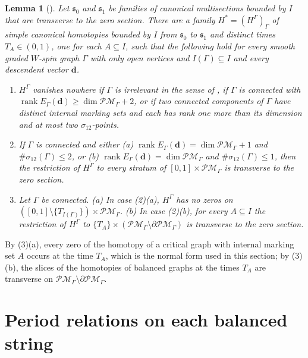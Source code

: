 \documentclass[11pt]{amsart}
\newtheorem{lemma}[theorem]{Lemma}
\theoremstyle{definition}
\theoremstyle{remark}
\begin{document}
\begin{lemma}[{\cite[Lem.~3.40]{GKT}}]
\label{lem:gktextension}
Let $\mathfrak s_0$ and $\mathfrak s_1$ be families of canonical multisections
bounded by $I$ that are transverse to the zero section.  There are a family
$H^*=(H^\Gamma)_\Gamma$ of simple canonical homotopies bounded by $I$ from
$\mathfrak s_0$ to $\mathfrak s_1$ and distinct times $T_A\in(0,1)$, one for
each $A\subseteq I$, such that the following hold for every smooth graded
$W$-spin graph $\Gamma$ with only open vertices and $I(\Gamma)\subseteq I$
and every descendent vector $\mathbf d$.
\begin{enumerate}
\item[(1)] $H^\Gamma$ vanishes nowhere if $\Gamma$ is irrelevant in the sense
of \cite[Def.~1.57]{GKT}, if $\Gamma$ is connected with
$\operatorname{rank}E_\Gamma(\mathbf d)\ge\dim\mathcal{PM}_\Gamma+2$, or if
two connected components of $\Gamma$ have distinct internal marking sets and
each has rank one more than its dimension and at most two
$\sigma_{12}$-points.
\item[(2)] If $\Gamma$ is connected and either (a)
$\operatorname{rank}E_\Gamma(\mathbf d)=\dim\mathcal{PM}_\Gamma+1$ and
$\#\sigma_{12}(\Gamma)\le2$, or (b)
$\operatorname{rank}E_\Gamma(\mathbf d)=\dim\mathcal{PM}_\Gamma$ and
$\#\sigma_{12}(\Gamma)\le1$, then the restriction of $H^\Gamma$ to every stratum of
$[0,1]\times\mathcal{PM}_\Gamma$ is transverse to the zero section.
\item[(3)] Let $\Gamma$ be connected.  (a) In case (2)(a), $H^\Gamma$ has no
zeros on $([0,1]\setminus\{T_{I(\Gamma)}\})\times\mathcal{PM}_\Gamma$.  (b) In
case (2)(b), for every $A\subseteq I$ the restriction of $H^\Gamma$ to
$\{T_A\}\times(\mathcal{PM}_\Gamma\setminus\partial\mathcal{PM}_\Gamma)$ is
transverse to the zero section.
\end{enumerate}
\end{lemma}

By (3)(a), every zero of the homotopy of a critical graph with internal
marking set $A$ occurs at the time $T_A$, which is the normal form used in
this section; by (3)(b), the slices of the homotopies of balanced graphs at
the times $T_A$ are transverse on
$\mathcal{PM}_\Gamma\setminus\partial\mathcal{PM}_\Gamma$.

\section{Period relations on each balanced string}
\label{sec:diagonal}
\end{document}
